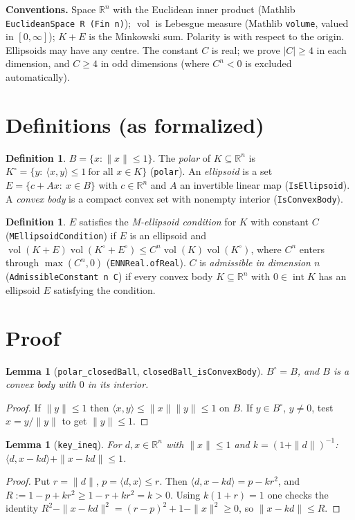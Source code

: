 \documentclass[11pt]{article}
\newtheorem{lemma}[theorem]{Lemma}
\theoremstyle{definition}
\newtheorem{definition}[theorem]{Definition}
\newcommand{\vol}{\operatorname{vol}}
\newcommand{\ip}[2]{\langle #1,#2\rangle}
\begin{document}
\textbf{Conventions.} Space $\mathbb{R}^n$ with the Euclidean inner product (Mathlib
\texttt{EuclideanSpace R (Fin n)}); $\vol$ is Lebesgue measure (Mathlib \texttt{volume}, valued in
$[0,\infty]$); $K+E$ is the Minkowski sum. Polarity is with respect to the origin. Ellipsoids may
have any centre. The constant $C$ is real; we prove $|C|\ge4$ in each dimension, and $C\ge 4$ in
odd dimensions (where $C^n<0$ is excluded automatically).

\section{Definitions (as formalized)}

\begin{definition}
$B=\{x:\|x\|\le1\}$. The \emph{polar} of $K\subseteq\mathbb{R}^n$ is
$K^\circ=\{y:\ \ip{x}{y}\le1\ \text{for all } x\in K\}$ (\texttt{polar}). An \emph{ellipsoid} is a
set $E=\{c+Ax:\ x\in B\}$ with $c\in\mathbb{R}^n$ and $A$ an invertible linear map
(\texttt{IsEllipsoid}). A \emph{convex body} is a compact convex set with nonempty interior
(\texttt{IsConvexBody}).
\end{definition}

\begin{definition}
$E$ satisfies the \emph{M-ellipsoid condition} for $K$ with constant $C$
(\texttt{MEllipsoidCondition}) if $E$ is an ellipsoid and
$\vol(K+E)\vol(K^\circ+E^\circ)\le C^n\vol(K)\vol(K^\circ)$, where $C^n$ enters through
$\max(C^n,0)$ (\texttt{ENNReal.ofReal}). $C$ is \emph{admissible in dimension $n$}
(\texttt{AdmissibleConstant n C}) if every convex body $K\subseteq\mathbb{R}^n$ with
$0\in\operatorname{int}K$ has an ellipsoid $E$ satisfying the condition.
\end{definition}

\section{Proof}

\begin{lemma}[\texttt{polar\_closedBall}, \texttt{closedBall\_isConvexBody}]
$B^\circ=B$, and $B$ is a convex body with $0$ in its interior.
\end{lemma}
\begin{proof}
If $\|y\|\le 1$ then $\ip{x}{y}\le\|x\|\|y\|\le1$ on $B$. If $y\in B^\circ$, $y\ne0$, test
$x=y/\|y\|$ to get $\|y\|\le 1$.
\end{proof}

\begin{lemma}[\texttt{key\_ineq}]
For $d,x\in\mathbb{R}^n$ with $\|x\|\le1$ and $k=(1+\|d\|)^{-1}$:
$\ip{d}{x-kd}+\|x-kd\|\le1$.
\end{lemma}
\begin{proof}
Put $r=\|d\|$, $p=\ip{d}{x}\le r$. Then $\ip{d}{x-kd}=p-kr^2$, and $R:=1-p+kr^2\ge 1-r+kr^2=k>0$.
Using $k(1+r)=1$ one checks the identity
$R^2-\|x-kd\|^2=(r-p)^2+1-\|x\|^2\ge0$, so $\|x-kd\|\le R$.
\end{proof}
\end{document}
